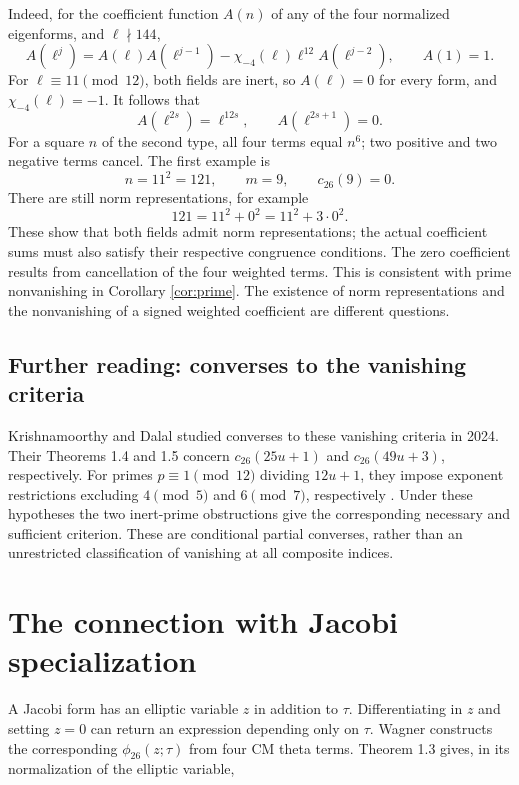 \documentclass[a4paper,11pt]{article}
\theoremstyle{definition}
\begin{document}
Indeed, for the coefficient function \(A(n)\) of any of the four
normalized eigenforms, and \(\ell\nmid144\),
\begin{equation}\label{eq:Heckerecurrence}
 A(\ell^j)=A(\ell)A(\ell^{j-1})
 -\chi_{-4}(\ell)\ell^{12}A(\ell^{j-2}),\qquad A(1)=1.
\end{equation}
For \(\ell\equiv11\pmod{12}\), both fields are inert, so
\(A(\ell)=0\) for every form, and \(\chi_{-4}(\ell)=-1\).
It follows that
\[
 A(\ell^{2s})=\ell^{12s},\qquad A(\ell^{2s+1})=0.
\]
For a square \(n\) of the second type, all four terms equal \(n^6\);
two positive and two negative terms cancel. The first example is
\begin{equation}\label{eq:firstzero}
 n=11^2=121,\qquad m=9,\qquad c_{26}(9)=0.
\end{equation}
There are still norm representations, for example
\[
 121=11^2+0^2=11^2+3\cdot0^2.
\]
These show that both fields admit norm representations; the actual coefficient
sums must also satisfy their respective congruence conditions.
The zero coefficient results from cancellation of the four weighted terms.
This is consistent with prime nonvanishing in Corollary \ref{cor:prime}.
The existence of norm representations and the nonvanishing of a
signed weighted coefficient are different questions.


\subsection{Further reading: converses to the vanishing criteria}
Krishnamoorthy and Dalal studied converses to these vanishing
criteria in 2024. Their Theorems 1.4 and 1.5 concern
\(c_{26}(25u+1)\) and \(c_{26}(49u+3)\), respectively.
For primes \(p\equiv1\pmod{12}\) dividing \(12u+1\), they impose
exponent restrictions excluding \(4\pmod5\) and \(6\pmod7\),
respectively \cite{KrishnamoorthyDalal2024}.
Under these hypotheses the two inert-prime obstructions give
the corresponding necessary and sufficient criterion.
These are conditional partial converses, rather than an unrestricted
classification of vanishing at all composite indices.

\section{The connection with Jacobi specialization}
A Jacobi form has an elliptic variable \(z\) in addition to \(\tau\).
Differentiating in \(z\) and setting \(z=0\) can return an expression
depending only on \(\tau\).
Wagner constructs the corresponding \(\phi_{26}(z;\tau)\) from four CM theta terms.
Theorem 1.3 gives, in its normalization of the elliptic variable,
\cite{Wagner2023}
\end{document}
